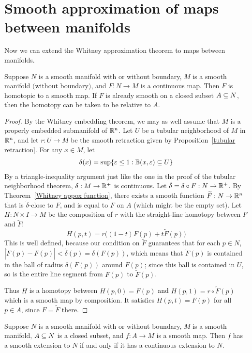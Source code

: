 \section{Smooth approximation of maps between manifolds}
Now we can extend the Whitney approximation theorem to maps between manifolds.
\begin{theorem}\label{Whitney approximation}
Suppose $N$ is a smooth manifold with or without boundary, $M$ is a smooth manifold $($without boundary$)$, and $F:N\to M$ is a continuous map. Then $F$ is homotopic to a smooth map. If $F$ is already smooth on a closed subset $A\subseteq N$, then the homotopy can be taken to be relative to $A$.
\end{theorem}
\begin{proof}
By the Whitney embedding theorem, we may as well assume that $M$ is a properly embedded submanifold of $\mathbb{R}^n$. Let $U$ be a tubular neighborhood of $M$ in $\mathbb{R}^n$, and let $r:U\to M$ be the smooth retraction given by Proposition~\ref{tubular retraction}. For any $x\in M$, let
\begin{align*}
\delta(x)=\sup\{\varepsilon\leq 1:\mathbb{B}(x,\varepsilon)\subseteq U\}
\end{align*}
By a triangle-inequality argument just like the one in the proof of the tubular neighborhood theorem, $\delta:M\to\mathbb{R}^+$ is continuous. Let $\tilde{\delta}=\delta\circ F:N\to\mathbb{R}^+$. By Theorem~\ref{Whitney appox function}, there exists a smooth function $\widetilde{F}:N\to\mathbb{R}^n$ that is $\tilde{\delta}$-close to $F$, and is equal to $F$ on $A$ (which might be the empty set). Let $H:N\times I\to M$ be the composition of $r$ with the straight-line homotopy between $F$ and $\widetilde{F}$:
\[H(p,t)=r\big((1-t)F(p)+t\widetilde{F}(p)\big)\]
This is well defined, because our condition on $\widetilde{F}$ guarantees that for each $p\in N$, $|\widetilde{F}(p)-F(p)|<\tilde{\delta}(p)=\delta(F(p))$, which means that $\widetilde{F}(p)$ is contained in the ball of radius $\delta(F(p))$ around $F(p)$; since this ball is contained in $U$, so is the entire line segment from $F(p)$ to $\widetilde{F}(p)$.\par
Thus $H$ is a homotopy between $H(p,0)=F(p)$ and $H(p,1)=r\circ\widetilde{F}(p)$ which is a smooth map by composition. It satisfies $H(p,t)=F(p)$ for all $p\in A$, since $F=\widetilde{F}$ there.
\end{proof}
\begin{corollary}
Suppose $N$ is a smooth manifold with or without boundary, $M$ is a smooth manifold, $A\subseteq N$ is a closed subset, and $f:A\to M$ is a smooth map. Then $f$ has a smooth extension to $N$ if and only if it has a continuous extension to $N$.
\end{corollary}
